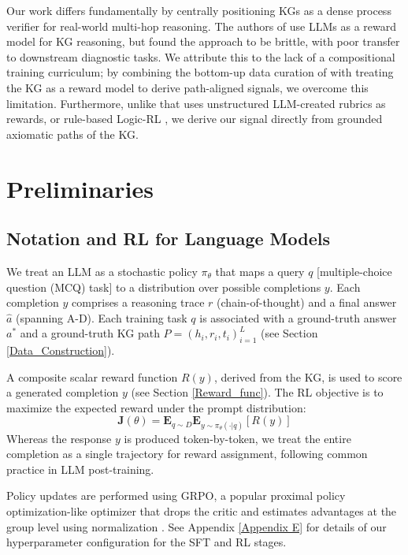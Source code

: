\documentclass{article}
\theoremstyle{plain}
\theoremstyle{definition}
\theoremstyle{remark}
\begin{document}
Our work differs fundamentally by centrally positioning KGs as a dense process verifier for real-world multi-hop reasoning. The authors of \cite{khatwani2025brittleness} use LLMs as a reward model for KG reasoning, but found the approach to be brittle, with poor transfer to downstream diagnostic tasks. We attribute this to the lack of a compositional training curriculum; by combining the bottom-up data curation of \cite{Dedhia2025Bottom-upNeed} with treating the KG as a reward model to derive path-aligned signals, we overcome this limitation. Furthermore, unlike \cite{GunjalRubrics} that uses unstructured LLM-created rubrics as rewards, or rule-based Logic-RL \cite{XieLogicRL}, we derive our signal directly from grounded axiomatic paths of the KG. 

\section{Preliminaries}


\subsection{Notation and RL for Language Models}
We treat an LLM as a stochastic policy $\pi_\theta$ that maps a query $q$ [multiple-choice question (MCQ) task] to a distribution over possible completions $y$. Each completion $y$ comprises a reasoning trace $r$ (chain-of-thought) \cite{wei2022chain} and a final answer $\hat{a}$ (spanning A-D). Each training task $q$ is associated with a ground-truth answer $a^*$ and a ground-truth KG path $P={(h_i,r_i,t_i)}^L_{i=1}$ (see Section \ref{Data_Construction}). 

A composite scalar reward function $R(y)$, derived from the KG, is used to score a generated completion $y$ (see Section \ref{Reward_func}). The RL objective is to maximize the expected reward under the prompt distribution: 
\vspace*{-1mm}
\[
\mathbf{J}(\theta) = \mathbf{E}_{q\sim D}\mathbf{E}_{y\sim\pi_{\theta}(\cdot|q)}[R(y)]
\]
Whereas the response $y$ is produced token-by-token, we treat the entire completion as a single trajectory for reward assignment, following common practice in LLM post-training.

Policy updates are performed using GRPO, a popular proximal policy optimization-like optimizer \cite{schulman2017proximal} that drops the critic and estimates advantages at the group level using normalization \citep{guo2025deepseek}. See Appendix \ref{Appendix E} for details of our hyperparameter configuration for the SFT and RL stages.
\end{document}
